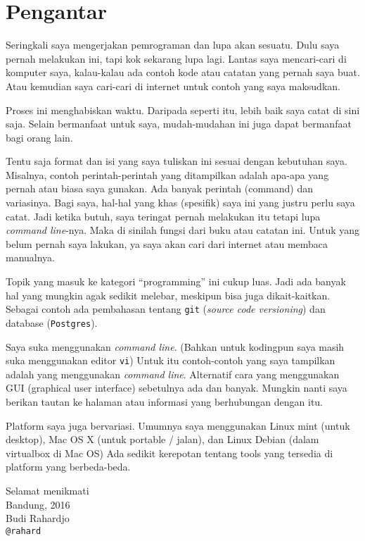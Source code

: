 \chapter*{Pengantar}

Seringkali saya mengerjakan pemrograman dan lupa akan sesuatu.
Dulu saya pernah melakukan ini, tapi kok sekarang lupa lagi.
Lantas saya mencari-cari di komputer saya, kalau-kalau ada contoh
kode atau catatan yang pernah saya buat.
Atau kemudian saya cari-cari di internet untuk contoh yang saya maksudkan.

Proses ini menghabiskan waktu.
Daripada seperti itu, lebih baik saya catat di sini saja.
Selain bermanfaat untuk saya, mudah-mudahan ini juga dapat bermanfaat
bagi orang lain.

Tentu saja format dan isi yang saya tuliskan ini sesuai dengan kebutuhan
saya. Misalnya, contoh perintah-perintah yang ditampilkan adalah apa-apa
yang pernah atau biasa saya gunakan.
Ada banyak perintah (command) dan variasinya.
Bagi saya, hal-hal yang khas (spesifik) saya ini yang justru perlu saya
catat. Jadi ketika butuh, saya teringat pernah melakukan itu tetapi
lupa {\em command line}-nya. Maka di sinilah fungsi dari buku atau
catatan ini. Untuk yang belum pernah saya lakukan, ya saya akan cari
dari internet atau membaca manualnya.

Topik yang masuk ke kategori ``programming'' ini cukup luas.
Jadi ada banyak hal yang mungkin agak sedikit melebar, meskipun
bisa juga dikait-kaitkan.
Sebagai contoh ada pembahasan tentang \texttt{git} 
({\em source code versioning}) dan database (\texttt{Postgres}).

Saya suka menggunakan {\em command line}. 
(Bahkan untuk kodingpun saya masih suka menggunakan editor \texttt{vi})
Untuk itu contoh-contoh yang saya tampilkan adalah yang menggunakan
{\em command line}.
Alternatif cara yang menggunakan GUI (graphical user interface)
sebetulnya ada dan banyak. Mungkin nanti saya berikan tautan
ke halaman atau informasi yang berhubungan dengan itu.

Platform saya juga bervariasi. Umumnya saya menggunakan
Linux mint (untuk desktop), Mac OS X (untuk portable / jalan), dan
Linux Debian (dalam virtualbox di Mac OS)
Ada sedikit kerepotan tentang tools yang tersedia di platform
yang berbeda-beda.

Selamat menikmati\\
Bandung, 2016\\
Budi Rahardjo\\
\texttt{@rahard}

